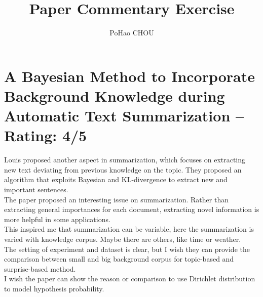 \documentclass[a4paper]{article}
\title{Paper Commentary Exercise}
\author{PoHao CHOU}
\begin{document}
\maketitle
\section{A Bayesian Method to Incorporate Background Knowledge during Automatic Text Summarization -- Rating: 4/5}
Louis \cite{Louis:ACL14} proposed another aspect in summarization, which focuses on extracting new text deviating from previous knowledge on the topic. They proposed an algorithm that exploits Bayesian and KL-divergence to extract new and important sentences.\\

The paper proposed an interesting issue on summarization. Rather than extracting general importances for each document, extracting novel information is more helpful in some applications.\\

This inspired me that summarization can be variable, here the summarization is varied with knowledge corpus. Maybe there are others, like time or weather.\\ 

The setting of experiment and dataset is clear, but I wish they can provide the comparison between small and big background corpus for topic-based and surprise-based method.\\

I wish the paper can show the reason or comparison to use Dirichlet distribution to model hypothesis probability.




\end{document}
